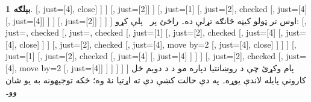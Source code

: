 \documentclass[12pt,a4paper,oneside]{report}
\newenvironment{oltableau}
  {\center\LTR\tableau{}}
  {\endtableau\endLTR\endcenter}
\theoremstyle{definition}
\newtheorem{ex}[thm]{بېلګه}
\begin{document}
\begin{ex}
\begin{oltableau}
            [,
              just={\TRule{\False}{\lor}[4]}, close]
          ]
        ]
        [,
          just={\TRule{\False}{\land}[2]}]
      ]
      [,
        just={\TRule{\True}{\lor}[1]}
        [,
          just={\TRule{\False}{\land}[2]}, checked
          [, just={\TRule{\False}{\lor}[4]}
            [,
              just={\TRule{\False}{\lor}[4]}]
          ]
        ]
        [,
          just={\TRule{\False}{\land}[2]}]
      ]
    ]
  ]
\end{oltableau}
اوس تر ټولو کيڼه څانګه تړلې ده۔ راځئ
\LR{$\TRule{\False}{\lor}$} پر~ پلې کړو:
\begin{oltableau}
  [,
    just=\TAss, checked
    [, just=\TAss, checked
      [, just={\TRule{\True}{\lor}[1]}
        [,
          just={\TRule{\False}{\land}[2]}, checked
          [,
            just={\TRule{\False}{\lor}[4]}
            [,
              just={\TRule{\False}{\lor}[4]}, close]
          ]
        ]
        [,
          just={\TRule{\False}{\land}[2]}, checked
          [,
            just={\TRule{\False}{\lor}[4]}, move by=2
            [,
              just={\TRule{\False}{\lor}[4]}, close]
          ]
        ]
      ]
      [,
        just={\TRule{\True}{\lor}[1]}
        [,
          just={\TRule{\False}{\land}[2]}, checked
          [,
            just={\TRule{\False}{\lor}[4]}
            [,
              just={\TRule{\False}{\lor}[4]}
            ]
          ]
        ]
        [,
          just={\TRule{\False}{\land}[2]}, checked
          [,
            just={\TRule{\False}{\lor}[4]}, move by=2
            [,
              just={\TRule{\False}{\lor}[4]}]
          ]
        ]
      ]
    ]
  ]
\end{oltableau}
پام وکړئ چې د روښانتيا دپاره مو د
\LR{$\TRule{\False}{\lor}$} د دويم ځل کارونې پايله لاندې يوړه۔ په دې
حالت کښې دې ته اړتيا نۀ وه؛ ځکه توجيهونه به يو شان وو۔
\label{olpseg:OLP-0103-B012:end}


\end{ex}
\end{document}
